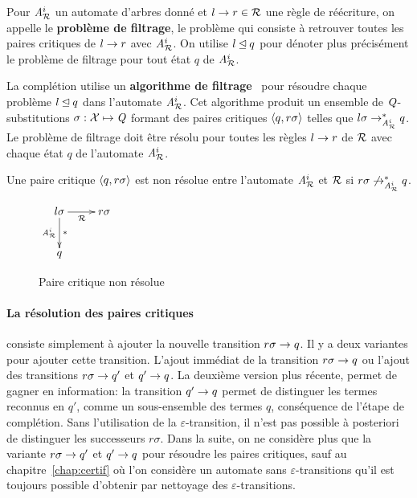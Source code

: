 \begin{definition}
  Pour ${\mathit A}_{\mathcal R}^i$ un automate d'arbres donné et $l \rightarrow r \in \mathcal R$ une
  règle de réécriture, on appelle le \textbf{problème de filtrage}, le
  problème qui consiste à retrouver toutes les paires critiques de $l
  \rightarrow r$ avec ${\mathit A}_{\mathcal R}^i$. On utilise $l \unlhd q$ pour dénoter plus précisément
  le problème de filtrage pour tout état $q$ de ${\mathit A}_{\mathcal R}^i$.
\end{definition}

La complétion utilise un \textbf{algorithme de filtrage}~\cite{FeuilladeGVTT-JAR04}
pour résoudre chaque problème $l \unlhd q$ dans l'automate ${\mathit A}_{\mathcal R}^i$. 
Cet algorithme produit un ensemble de $\mathit Q$-substitutions $\sigma: \mathcal X \mapsto \mathit Q$
formant des paires critiques $\langle q, r\sigma\rangle$ telles que $l\sigma \rightarrow_{{\mathit A}_{\mathcal R}^i}^* q$.
Le problème de filtrage doit être résolu pour toutes les règles $l\rightarrow r$ de $\mathcal R$ avec
chaque état $q$ de l'automate ${\mathit A}_{\mathcal R}^i$.

\begin{definition}
  Une paire critique $\langle q, r\sigma\rangle$ est non résolue entre l'automate ${\mathit A}_{\mathcal R}^i$ et $\mathcal R$ si $r\sigma \not\rightarrow_{{\mathit A}_{\mathcal R}^i}^* q$.
  \begin{figure}[ht!]
    \centering
    $
    \xymatrix{
      l\sigma \ar[r]_{\R}\ar[d]^{*}_{\aaex^i} & r\sigma \\%
      q & %
    }
    $
    \caption{\footnotesize Paire critique non résolue\label{fig:cp}}
  \end{figure}  
\end{definition}

\paragraph{La résolution des paires critiques} consiste simplement à ajouter la nouvelle transition $r\sigma \rightarrow q$.
Il y a deux variantes pour ajouter cette transition. L'ajout immédiat de la transition $r\sigma \rightarrow q$
ou l'ajout des transitions $r\sigma \rightarrow q'$ et $q' \rightarrow q$. La deuxième version plus récente, permet de 
gagner en information: la transition $q' \rightarrow q$ permet de distinguer les termes reconnus en $q'$, comme 
un sous-ensemble des termes $q$, conséquence de l'étape de complétion. Sans l'utilisation de la $\varepsilon$-transition,
il n'est pas possible à posteriori de distinguer les successeurs $r\sigma$. 
Dans la suite, on ne considère plus que la variante $r\sigma \rightarrow q'$ et $q' \rightarrow q$ pour résoudre les paires critiques,
sauf au chapitre~\ref{chap:certif} où l'on considère un automate  sans $\varepsilon$-transitions
qu'il est toujours possible d'obtenir par nettoyage des $\varepsilon$-transitions.

